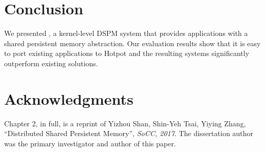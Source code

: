 \section{Conclusion}
\label{sec:hotpot:conclude}

We presented \hotpot, a kernel-level DSPM system that provides applications
with a shared persistent memory abstraction. Our evaluation results show that
it is easy to port existing applications to Hotpot and the resulting systems
significantly outperform existing solutions.

\section{Acknowledgments}

Chapter 2, in full, is a reprint of Yizhou Shan, Shin-Yeh Tsai, Yiying Zhang, ``Distributed Shared Persistent Memory'', \textit{SoCC, 2017}. The dissertation author was the primary investigator and author of this paper.